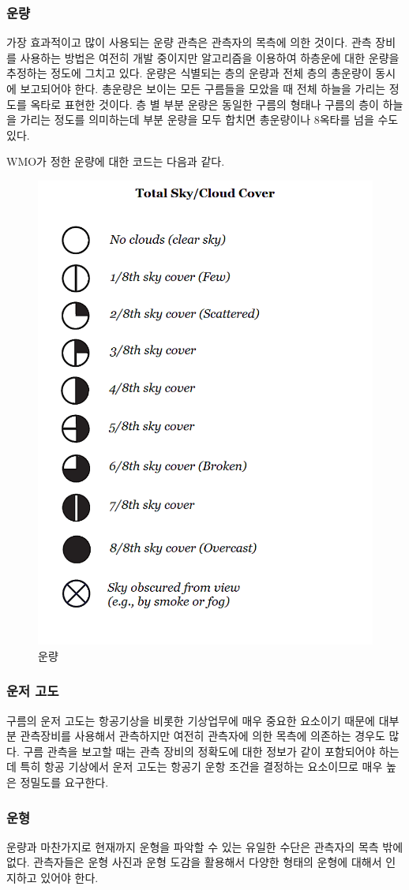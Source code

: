 \subsubsection{운량}
가장 효과적이고 많이 사용되는 운량 관측은 관측자의 목측에 의한 것이다. 관측 장비를 사용하는 방법은 여전히 개발 중이지만 알고리즘을 이용하여 하층운에 대한 운량을 추정하는 정도에 그치고 있다. 운량은 식별되는 층의 운량과 전체 층의 총운량이 동시에 보고되어야 한다. 총운량은 보이는 모든 구름들을 모았을 때 전체 하늘을 가리는 정도를 옥타로 표현한 것이다. 층
별 부분 운량은 동일한 구름의 형태나 구름의 층이 하늘을 가리는 정도를 의미하는데 부분 운량을 모두 합치면 총운량이나 8옥타를 넘을 수도 있다.

WMO가 정한 운량에 대한 코드는 다음과 같다.

\begin{figure}[h]
	\centering
	\includegraphics[width=0.4\linewidth]{21observing/images/sky-cover_key-58b740215f9b5880804caa18}
	\caption{운량}
	\label{fig:okta}
\end{figure}

\subsubsection{운저 고도}
구름의 운저 고도는 항공기상을 비롯한 기상업무에 매우 중요한 요소이기 때문에 대부분 관측장비를 사용해서 관측하지만 여전히 관측자에 의한 목측에 의존하는 경우도 많다. 구름 관측을 보고할 때는 관측 장비의 정확도에 대한 정보가 같이 포함되어야 하는데 특히 항공 기상에서 운저 고도는 항공기 운항 조건을 결정하는 요소이므로 매우 높은 정밀도를 요구한다.

\subsubsection{운형}
운량과 마찬가지로 현재까지 운형을 파악할 수 있는 유일한 수단은 관측자의 목측 밖에 없다. 관측자들은 운형 사진과 운형 도감을 활용해서 다양한 형태의 운형에 대해서 인지하고 있어야 한다.

